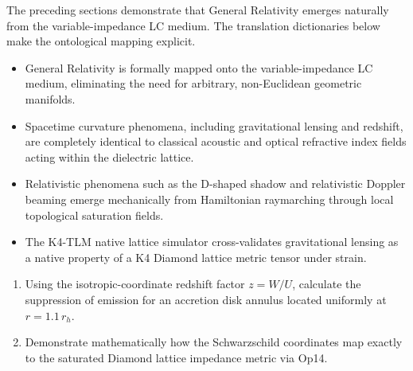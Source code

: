 The preceding sections demonstrate that General Relativity emerges naturally from the variable-impedance LC medium.  The translation dictionaries below make the ontological mapping explicit.





\begin{summarybox}
\begin{itemize}
    \item General Relativity is formally mapped onto the variable-impedance LC medium, eliminating the need for arbitrary, non-Euclidean geometric manifolds.
    \item Spacetime curvature phenomena, including gravitational lensing and redshift, are completely identical to classical acoustic and optical refractive index fields acting within the dielectric lattice.
    \item Relativistic phenomena such as the D-shaped shadow and relativistic Doppler beaming emerge mechanically from Hamiltonian raymarching through local topological saturation fields.
    \item The K4-TLM native lattice simulator cross-validates gravitational lensing as a native property of a K4 Diamond lattice metric tensor under strain.
\end{itemize}
\end{summarybox}

\begin{exercisebox}
\begin{enumerate}
    \item Using the isotropic-coordinate redshift factor $z = W/U$, calculate the suppression of emission for an accretion disk annulus located uniformly at $r = 1.1 \, r_h$. 
    \item Demonstrate mathematically how the Schwarzschild coordinates map exactly to the saturated Diamond lattice impedance metric via Op14.
\end{enumerate}
\end{exercisebox}

